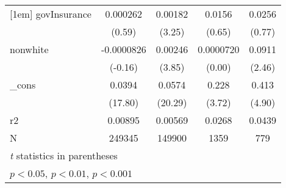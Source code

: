 \begin{table}[htbp]
\begin{tabular}{l*{4}{c}}
[1em]
govInsurance&    0.000262         &     0.00182\sym{**} &      0.0156         &      0.0256         \\
            &      (0.59)         &      (3.25)         &      (0.65)         &      (0.77)         \\
[1em]
nonwhite    &  -0.0000826         &     0.00246\sym{***}&   0.0000720         &      0.0911\sym{*}  \\
            &     (-0.16)         &      (3.85)         &      (0.00)         &      (2.46)         \\
[1em]
\_cons      &      0.0394\sym{***}&      0.0574\sym{***}&       0.228\sym{***}&       0.413\sym{***}\\
            &     (17.80)         &     (20.29)         &      (3.72)         &      (4.90)         \\
\hline
r2          &     0.00895         &     0.00569         &      0.0268         &      0.0439         \\
N           &      249345         &      149900         &        1359         &         779         \\
\hline\hline
\multicolumn{5}{l}{\footnotesize \textit{t} statistics in parentheses}\\
\multicolumn{5}{l}{\footnotesize \sym{*} \(p<0.05\), \sym{**} \(p<0.01\), \sym{***} \(p<0.001\)}\\
\end{tabular}
\end{table}

